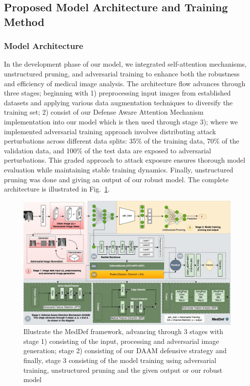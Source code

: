 \documentclass[preprint,12pt]{elsarticle}
\begin{document}
\subsection{Proposed Model Architecture and Training Method}

\subsubsection{Model Architecture}
In the development phase of our model, we integrated self-attention mechanisms, unstructured pruning, and adversarial training to enhance both the robustness and efficiency of medical image analysis. The architecture flow advances through three stages; beginning with 1) preprocessing input images from established datasets and applying various data augmentation techniques to diversify the training set; 2) consist of our Defense Aware Attention Mechanism implementation into our model which is then used through stage 3); where we implemented adversarial training approach involves distributing attack perturbations across different data splits: 35\% of the training data, 70\% of the validation data, and 100\% of the test data are exposed to adversarial perturbations. This graded approach to attack exposure ensures thorough model evaluation while maintaining stable training dynamics. Finally, unstructured pruning was done and giving an output of our robust model. The complete architecture is illustrated in Fig.~\ref{fig:model_architecture}.

\begin{figure}[!t]
\centering
\includegraphics[width=\columnwidth]{fig/fig2.jpg}
\caption{Illustrate the MedDef framework, advancing through 3 stages with stage 1) consisting of the input, processing and adversarial image generation; stage 2) consisting of our DAAM defensive strategy and finally, stage 3 consisting of the model training using adversarial training, unstructured pruning and the given output or our robust model}
\label{fig:model_architecture}
\end{figure}
\end{document}
